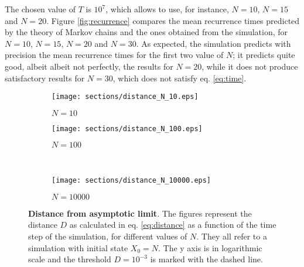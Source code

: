 The chosen value of $T$ is $10^7$, which allows to use, for instance, $N= 10$, $N= 15$ and $N= 20$.
Figure \ref{fig:recurrence} compares the mean recurrence times predicted by the theory of Markov chains and the ones obtained from the simulation, for $N= 10$, $N= 15$, $N= 20$ and $N= 30$. As expected, the simulation predicts with precision the mean recurrence times for the first two value of $N$; it predicts quite good, albeit albeit not perfectly, the results for $N = 20$, while it does not produce satisfactory results for $N= 30$, which does not satisfy eq. \ref{eq:time}.

\begin{figure}[H]
  \begin{subfigure}{.5\textwidth}
      \centering
      \texttt{[image: sections/distance\_N\_10.eps]}
      \caption{$N = 10$}
    \end{subfigure}
    \begin{subfigure}{.5\textwidth}
      \centering
      \texttt{[image: sections/distance\_N\_100.eps]}
      \caption{$N = 100$}
    \end{subfigure}\\
    \begin{center}
    \begin{subfigure}{0.5\textwidth}
      \centering
      \texttt{[image: sections/distance\_N\_10000.eps]}
      \caption{$N = 10000$}
    \end{subfigure}%
  \end{center}

  \captionsetup{width=.9\linewidth}
  \caption{\textbf{Distance from asymptotic limit}. The figures represent the distance $D$ as calculated in eq. \ref{eq:distance} as a function of the time step of the simulation, for different values of $N$. They all refer to a simulation with initial state $X_0 = N$. The y axis is in logarithmic scale and the threshold $D = 10^{-3}$ is marked with the dashed line.}
  \label{fig:distances}
\end{figure}

